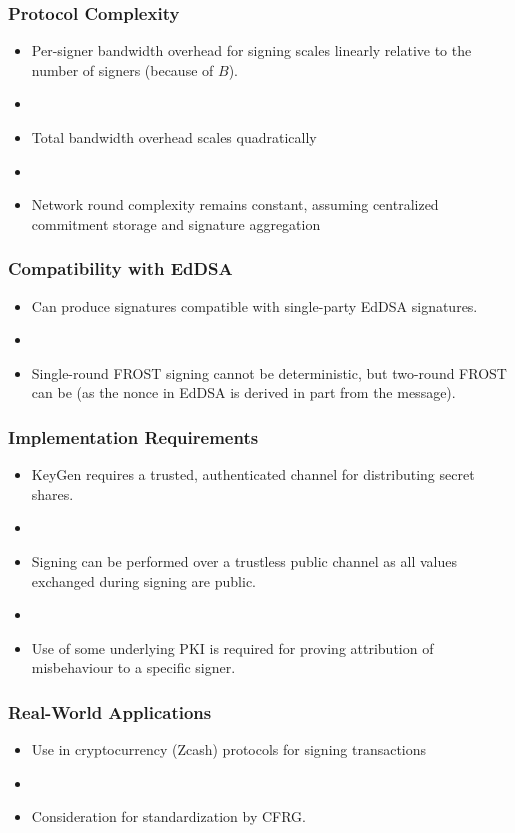 \documentclass[hyperref={pdfpagelabels=true},table,dvipsnames,14pt,aspectratio=169]{beamer}
\begin{document}
\begin{frame}
  \frametitle{Protocol Complexity}

  \begin{itemize}
    \item<1-> Per-signer bandwidth overhead for signing scales linearly
      relative to the number of signers (because of $B$).
    \item[]~
    \item<2-> Total bandwidth overhead scales quadratically
    \item[]~
    \item<3-> Network round complexity remains constant, assuming centralized
      commitment storage and signature aggregation
  \end{itemize}

\end{frame}

\begin{frame}
  \frametitle{Compatibility with EdDSA}

  \begin{itemize}
    \item<1-> Can produce signatures compatible with single-party EdDSA
      signatures.
    \item[]
    \item<2-> Single-round FROST signing cannot be deterministic, but two-round
      FROST can be (as the nonce in EdDSA is derived in part from the message).
  \end{itemize}
\end{frame}

\begin{frame}
  \frametitle{Implementation Requirements}

  \begin{itemize}
    \item<1-> KeyGen requires a trusted, authenticated channel for distributing
      secret shares.
    \item[]
    \item<2-> Signing can be performed over a trustless public channel as all
      values exchanged during signing are public.
    \item[]
    \item<3-> Use of some underlying PKI is required for proving attribution of
      misbehaviour to a specific signer.
  \end{itemize}
\end{frame}

\begin{frame}
  \frametitle{Real-World Applications}

  \begin{itemize}
    \item<1-> Use in cryptocurrency (Zcash) protocols for signing transactions
    \item[]
    \item<2-> Consideration for standardization by CFRG.
  \end{itemize}
\end{frame}
\end{document}
